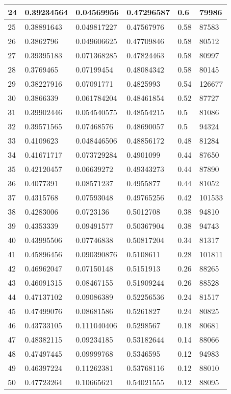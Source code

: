 \begin{longtable}{|l|l|l|l|l|l|}
24 & 0.39234564 & 0.04569956 & 0.47296587 & 0.6 & 79986 \\ \hline 
25 & 0.38891643 & 0.049817227 & 0.47567976 & 0.58 & 87583 \\ \hline 
26 & 0.3862796 & 0.049606625 & 0.47709846 & 0.58 & 80512 \\ \hline 
27 & 0.39395183 & 0.071368285 & 0.47824463 & 0.58 & 80997 \\ \hline 
28 & 0.3769465 & 0.07199454 & 0.48084342 & 0.58 & 80145 \\ \hline 
29 & 0.38227916 & 0.07091771 & 0.4825993 & 0.54 & 126677 \\ \hline 
30 & 0.3866339 & 0.061784204 & 0.48461854 & 0.52 & 87727 \\ \hline 
31 & 0.39902446 & 0.054540575 & 0.48554215 & 0.5 & 81086 \\ \hline 
32 & 0.39571565 & 0.07468576 & 0.48690057 & 0.5 & 94324 \\ \hline 
33 & 0.4109623 & 0.048446506 & 0.48856172 & 0.48 & 81284 \\ \hline 
34 & 0.41671717 & 0.073729284 & 0.4901099 & 0.44 & 87650 \\ \hline 
35 & 0.42120457 & 0.06639272 & 0.49343273 & 0.44 & 87890 \\ \hline 
36 & 0.4077391 & 0.08571237 & 0.4955877 & 0.44 & 81052 \\ \hline 
37 & 0.4315768 & 0.07593048 & 0.49765256 & 0.42 & 101533 \\ \hline 
38 & 0.4283006 & 0.0723136 & 0.5012708 & 0.38 & 94810 \\ \hline 
39 & 0.4353339 & 0.09491577 & 0.50367904 & 0.38 & 94743 \\ \hline 
40 & 0.43995506 & 0.07746838 & 0.50817204 & 0.34 & 81317 \\ \hline 
41 & 0.45896456 & 0.090390876 & 0.5108611 & 0.28 & 101811 \\ \hline 
42 & 0.46962047 & 0.07150148 & 0.5151913 & 0.26 & 88265 \\ \hline 
43 & 0.46091315 & 0.08467155 & 0.51909244 & 0.26 & 88528 \\ \hline 
44 & 0.47137102 & 0.09086389 & 0.52256536 & 0.24 & 81517 \\ \hline 
45 & 0.47499076 & 0.08681586 & 0.5261827 & 0.24 & 80825 \\ \hline 
46 & 0.43733105 & 0.111040406 & 0.5298567 & 0.18 & 80681 \\ \hline 
47 & 0.48382115 & 0.09234185 & 0.53182644 & 0.14 & 88066 \\ \hline 
48 & 0.47497445 & 0.09999768 & 0.5346595 & 0.12 & 94983 \\ \hline 
49 & 0.46397224 & 0.11262381 & 0.53768116 & 0.12 & 88010 \\ \hline 
50 & 0.47723264 & 0.10665621 & 0.54021555 & 0.12 & 88095 \\ \hline 
\end{longtable}